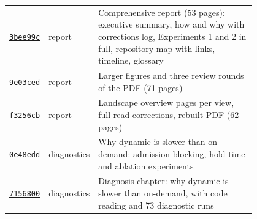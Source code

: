 {\begin{longtable}{@{}lp{0.12\linewidth}p{0.68\linewidth}@{}}
\href{https://github.com/sanjeevkrishnaa/Compiler-Driven-ACE/commit/3bee99c}{\texttt{3bee99c}} & report & Comprehensive report (53 pages): executive summary, how and why with corrections log, Experiments 1 and 2 in full, repository map with links, timeline, glossary \\
\href{https://github.com/sanjeevkrishnaa/Compiler-Driven-ACE/commit/9e03ced}{\texttt{9e03ced}} & report & Larger figures and three review rounds of the PDF (71 pages) \\
\href{https://github.com/sanjeevkrishnaa/Compiler-Driven-ACE/commit/f3256cb}{\texttt{f3256cb}} & report & Landscape overview pages per view, full-read corrections, rebuilt PDF (62 pages) \\
\href{https://github.com/sanjeevkrishnaa/Compiler-Driven-ACE/commit/0e48edd}{\texttt{0e48edd}} & diagnostics & Why dynamic is slower than on-demand: admission-blocking, hold-time and ablation experiments \\
\href{https://github.com/sanjeevkrishnaa/Compiler-Driven-ACE/commit/7156800}{\texttt{7156800}} & diagnostics & Diagnosis chapter: why dynamic is slower than on-demand, with code reading and 73 diagnostic runs \\
\end{longtable}}
